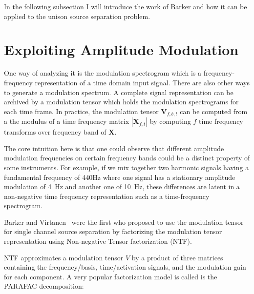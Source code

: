 In the following subsection I will introduce the work of Barker and how it can be applied to the unison source separation problem.

\section{Exploiting Amplitude Modulation}
\label{sub:am}


One way of analyzing it is the modulation spectrogram which is a frequency-frequency representation of a time domain input signal.
There are also other ways to generate a modulation spectrum.
A complete signal representation can be archived by a modulation tensor which holds the modulation spectrograms for each time frame.
In practice, the modulation tensor \(\mathbf{V}_{f, b, t}\) can be computed from a the modulus of a time frequency matrix \(| \mathbf{X}_{f, t} |\) by computing \(f\) time frequency transforms over frequency band of \(\mathbf{X}\).


The core intuition here is that one could observe that different amplitude modulation frequencies on certain frequency bands could be a distinct property of some instruments.
For example, if we mix together two harmonic signals having a fundamental frequency of 440Hz where one signal has a stationary amplitude modulation of 4~Hz and another one of 10~Hz, these differences are latent in a non-negative time frequency representation such as a time-frequency spectrogram.

Barker and Virtanen~\cite{barker13} were the first who proposed to use the modulation tensor for single channel source separation by factorizing the modulation tensor representation using Non-negative Tensor factorization (NTF).

NTF approximates a modulation tensor \(V\) by a product of three matrices containing the frequency/basis, time/activation signals, and the modulation gain for each component.
A very popular factorization model is called is the PARAFAC decomposition:

